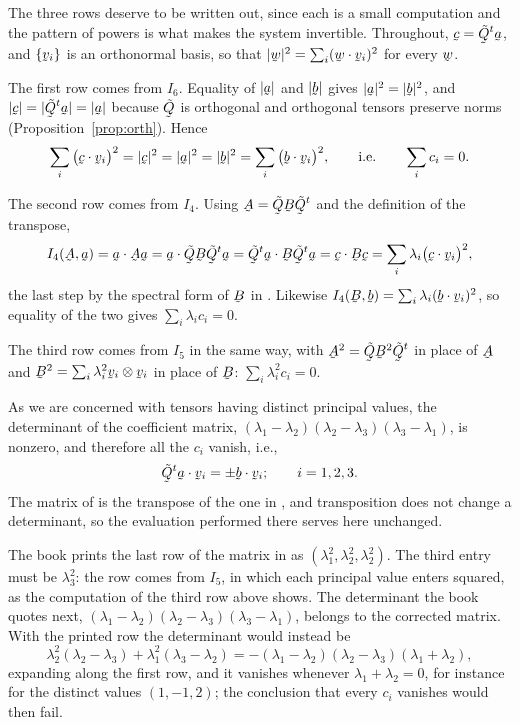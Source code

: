 The three rows deserve to be written out, since each is a small
computation and the pattern of powers is what makes the system
invertible. Throughout, $\bc=\tilde\bQ^{t}\ba$, and $\{\bv_{i}\}$ is an
orthonormal basis, so that $|\bw|^{2}=\sum_{i}(\ip\bw{\bv_{i}})^{2}$ for
every $\bw$.

The first row comes from $I_{6}$. Equality of $|\ba|$ and $|\bb|$ gives
$|\ba|^{2}=|\bb|^{2}$, and $|\bc|=|\tilde\bQ^{t}\ba|=|\ba|$ because
$\tilde\bQ$ is orthogonal and orthogonal tensors preserve norms
(Proposition~\ref{prop:orth}). Hence
\[
   \sum_{i}\big(\ip\bc{\bv_{i}}\big)^{2}=|\bc|^{2}=|\ba|^{2}=|\bb|^{2}
   =\sum_{i}\big(\ip\bb{\bv_{i}}\big)^{2},
   \qquad\text{i.e.}\qquad
   \sum_{i}c_{i}=0 .
\]

The second row comes from $I_{4}$. Using $\bA=\tilde\bQ\bB\tilde\bQ^{t}$
and
the definition of the transpose,
\[
   I_{4}(\bA,\ba)=\ip\ba{\bA\ba}
   =\ip\ba{\tilde\bQ\bB\tilde\bQ^{t}\ba}
   =\ip{\tilde\bQ^{t}\ba}{\bB\tilde\bQ^{t}\ba}
   =\ip\bc{\bB\bc}
   =\sum_{i}\lambda_{i}\big(\ip\bc{\bv_{i}}\big)^{2},
\]
the last step by the spectral form of $\bB$ in . Likewise
$I_{4}(\bB,\bb)=\sum_{i}\lambda_{i}(\ip\bb{\bv_{i}})^{2}$, so equality
of the two gives $\sum_{i}\lambda_{i}c_{i}=0$.

The third row comes from $I_{5}$ in the same way, with
$\bA^{2}=\tilde\bQ\bB^{2}\tilde\bQ^{t}$ in place of $\bA$ and
$\bB^{2}=\sum_{i}\lambda_{i}^{2}\bv_{i}\otimes\bv_{i}$ in place of
$\bB$: $\sum_{i}\lambda_{i}^{2}c_{i}=0$.

As we are concerned with tensors having distinct principal values, the
determinant of the coefficient matrix,
$(\lambda_{1}-\lambda_{2})(\lambda_{2}-\lambda_{3})
(\lambda_{3}-\lambda_{1})$, is nonzero, and therefore all the $c_{i}$
vanish, i.e.,
\[
   \ip{\tilde\bQ^{t}\ba}{\bv_{i}}=\pm\ip\bb{\bv_{i}};
   \qquad i=1,2,3 .
\]
The matrix of  is the transpose of the one in , and
transposition does not change a determinant, so the evaluation performed
there serves here unchanged.

\begin{remark}\label{rem:ch9mis57}
The book prints the last row of the matrix in  as
$(\lambda_{1}^{2},\lambda_{2}^{2},\lambda_{2}^{2})$. The third entry
must be $\lambda_{3}^{2}$: the row comes from $I_{5}$, in which each
principal value enters squared, as the computation of the third row
above shows. The determinant the book quotes next,
$(\lambda_{1}-\lambda_{2})(\lambda_{2}-\lambda_{3})(\lambda_{3}-\lambda_{1})$,
belongs to the corrected matrix. With the printed row the determinant
would instead be
\[
   \lambda_{2}^{2}(\lambda_{2}-\lambda_{3})
   +\lambda_{1}^{2}(\lambda_{3}-\lambda_{2})
   =-(\lambda_{1}-\lambda_{2})(\lambda_{2}-\lambda_{3})
    (\lambda_{1}+\lambda_{2}),
\]
expanding along the first row, and it vanishes whenever
$\lambda_{1}+\lambda_{2}=0$, for instance for the distinct values
$(1,-1,2)$; the conclusion that every $c_{i}$ vanishes would then fail.
\end{remark}


